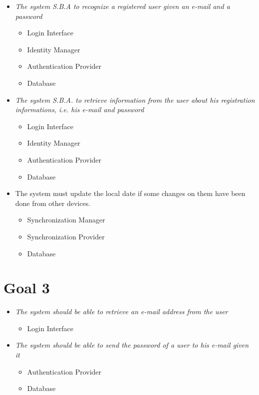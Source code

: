 \begin{itemize}

\item \textit{The system S.B.A to recognize a registered user given an e-mail and a password}

\begin{itemize}
\item Login Interface
\item Identity Manager
\item Authentication Provider
\item Database
\end{itemize}

\item \textit{The system S.B.A. to retrieve information from the user about his registration informations, i.e. his e-mail and password}

\begin{itemize}
\item Login Interface
\item Identity Manager
\item Authentication Provider
\item Database
\end{itemize}

\item The system must update the local date if some changes on them have been done from other devices.

\begin{itemize}
\item Synchronization Manager
\item Synchronization Provider
\item Database
\end{itemize}

\end{itemize}

\section{Goal 3}

\begin{itemize}

\item \textit{The system should be able to retrieve an e-mail address from the user}

\begin{itemize}
\item Login Interface
\end{itemize}

\item \textit{ The system should be able to send the password of a user to his e-mail given it}

\begin{itemize}
\item Authentication Provider
\item Database
\end{itemize}

\end{itemize}


